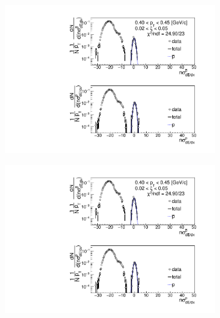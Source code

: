 \begin{figure}[h!]
\begin{subfigure}{.32\textwidth}
	\end{subfigure}
	\begin{subfigure}{.32\textwidth}
		\includegraphics[width=\linewidth, page=9]{chapters/chrgSTAR/img/dEdx/fit2019_thirdStep_2_0.pdf}
	\end{subfigure}
	\begin{subfigure}{.32\textwidth}
		\includegraphics[width=\linewidth, page=10]{chapters/chrgSTAR/img/dEdx/fit2019_thirdStep_2_0.pdf}
	\end{subfigure}
	\begin{subfigure}{.32\textwidth}

\end{subfigure}
\end{figure}
